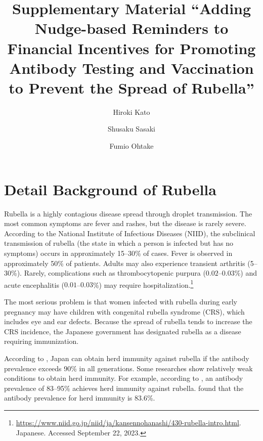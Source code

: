 \documentclass[
    a4paper
]{article}
\title{Supplementary Material
``Adding Nudge-based Reminders to Financial Incentives for Promoting Antibody Testing and Vaccination to Prevent the Spread of Rubella''}
\author[a]{Hiroki Kato}
\author[b]{Shusaku Sasaki}
\author[b]{Fumio Ohtake}
\affil[a]{Graduate School of Economics, Osaka University}
\affil[b]{Center for Infectious Disease Education and Research (CiDER), Osaka University}
\date{}
\begin{document}
\begin{spacing}{1}
\maketitle
\end{spacing}


{
\setcounter{tocdepth}{2}
\tableofcontents
}

\setcounter{footnote}{0}
\hypertarget{appendix-appendix}{%
\appendix}


\hypertarget{detail-background-of-rubella}{%
\section{Detail Background of Rubella}\label{detail-background-of-rubella}}

Rubella is a highly contagious disease spread through droplet transmission. The most common symptoms are fever and rashes, but the disease is rarely severe. According to the National Institute of Infectious Diseases (NIID), the subclinical transmission of rubella (the state in which a person is infected but has no symptoms) occurs in approximately 15--30\% of cases. Fever is observed in approximately 50\% of patients. Adults may also experience transient arthritis (5--30\%). Rarely, complications such as thrombocytopenic purpura (\(0.02\)--\(0.03\)\%) and acute encephalitis (\(0.01\)--\(0.03\)\%) may require hospitalization.\footnote{\url{https://www.niid.go.jp/niid/ja/kansennohanashi/430-rubella-intro.html}. Japanese. Accessed September 22, 2023.}

The most serious problem is that women infected with rubella during early pregnancy may have children with congenital rubella syndrome (CRS), which includes eye and ear defects. Because the spread of rubella tends to increase the CRS incidence, the Japanese government has designated rubella as a disease requiring immunization.

According to \citet{Kinoshita2016}, Japan can obtain herd immunity against rubella if the antibody prevalence exceeds 90\% in all generations. Some researches show relatively weak conditions to obtain herd immunity. For example, according to \citet{Plans-Rubio2012}, an antibody prevalence of 83--95\% achieves herd immunity against rubella. \citet{Nishiura2015} found that the antibody prevalence for herd immunity is 83.6\%.
\end{document}
